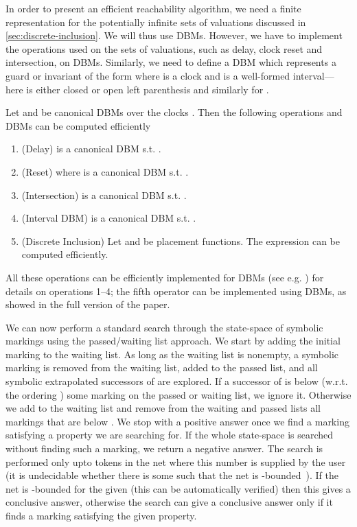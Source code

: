 In order to present an efficient reachability algorithm, we need a finite representation for the potentially infinite sets of valuations discussed in \cref{sec:discrete-inclusion}. We will thus use DBMs. However, we have to implement the operations used on the sets of valuations, such as delay, clock reset and intersection, on DBMs. Similarly, we need to define a DBM which represents a guard or invariant of the form  where  is a clock and  is a well-formed interval---here 
 is either closed or open left parenthesis and
similarly for .

\begin{proposition}
Let  and  be canonical DBMs over the clocks . Then the following operations and DBMs can be computed efficiently
\begin{enumerate}
\item (Delay)  is a canonical DBM s.t. .
\item (Reset)  where  is a canonical DBM s.t. .
\item (Intersection)  is a canonical DBM s.t. .
\item (Interval DBM)  is a canonical DBM s.t. .
\item (Discrete Inclusion) Let  and  be placement functions. The expression  can be computed efficiently.
\end{enumerate}
\end{proposition}
All these operations can be efficiently implemented for 
DBMs (see e.g. \cite{pettersson_phd, DBLP:conf/ac/BengtssonY03})
for details on operations 1--4; the fifth operator can be implemented using 
DBMs, as showed in the full version of the paper.



We can now perform a standard search through the state-space of symbolic
markings using the passed/waiting list approach. We start by
adding the initial marking to the waiting list. As long as the waiting
list is nonempty, a symbolic marking  is removed from the waiting list,
added to the passed list, and all symbolic extrapolated successors of 
are explored. If a successor  of  is below (w.r.t. the
ordering ) some marking on the passed or waiting
list, we ignore it. Otherwise we add  to the waiting list and
remove from the waiting and passed lists all markings that are below .
We stop with a positive answer once we find a marking satisfying a property
we are searching for.
If the whole state-space is searched without finding such a marking, we
return a negative answer.
The search is performed only upto  tokens in the net where this
number is supplied by the user (it is undecidable whether
there is some  such that the net is -bounded~\cite{memics_paper}).
If the net is -bounded for the given  (this can be automatically
verified) then this gives
a conclusive answer, otherwise the search can give a conclusive
answer only if it finds a marking satisfying the given property.

